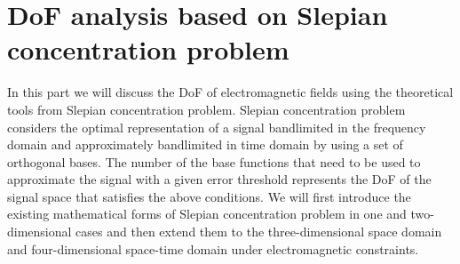 \documentclass[12pt,draftclsnofoot,journal,onecolumn]{IEEEtran}
\begin{document}
	\section{DoF analysis based on Slepian concentration problem}
	\label{sec_theoretical_dof}
	In this part we will discuss the DoF of electromagnetic fields using the theoretical tools from Slepian concentration problem. 
	Slepian concentration problem considers the optimal representation of a signal bandlimited in the frequency domain and approximately bandlimited in time domain by using a set of orthogonal bases. The number of the base functions that need to be used to approximate the signal with a given error threshold represents the DoF of the signal space that satisfies the above conditions. We will first introduce the existing mathematical forms of Slepian concentration problem in one and two-dimensional cases and then extend them to the three-dimensional space domain and four-dimensional space-time domain under electromagnetic constraints. 
	
\end{document}
